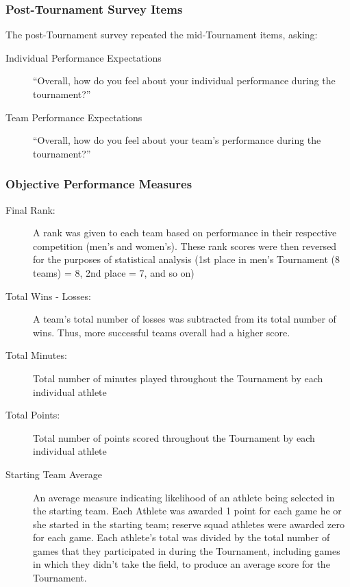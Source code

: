 \begin{CJK}{UTF8}{gbsn}
\subsubsection{Post-Tournament Survey Items\label{app8:surveyPost}}
The post-Tournament survey repeated the mid-Tournament items, asking:
\begin{description}
\item [Individual Performance Expectations] ``Overall, how do you feel about your individual performance during the tournament?''
\item [Team Performance Expectations]``Overall, how do you feel about your team's performance during the tournament?''
\end{description}

\subsubsection{Objective Performance Measures\label{app8:objectivePerformance}}

\begin{description}
\item [Final Rank:] A rank was given to each team based on performance in their respective competition (men's and women's). These rank scores were then reversed for the purposes of statistical analysis (1st place in men's Tournament (8 teams) = 8, 2nd place = 7, and so on)
\item [Total Wins - Losses:] A team's total number of losses was subtracted from its total number of wins.  Thus, more successful teams overall had a higher score.
\item [Total Minutes:] Total number of minutes played throughout the Tournament by each individual athlete
\item [Total Points:] Total number of points scored throughout the Tournament by each individual athlete
\item [Starting Team Average] An average measure indicating likelihood of an athlete being selected in the starting team. Each Athlete was awarded 1 point for each game he or she started in the starting team; reserve squad athletes were awarded zero for each game. Each athlete's total was divided by the total number of games that they participated in during the Tournament, including games in which they didn't take the field, to produce an average score for the Tournament.
\end{description}








\end{CJK}
